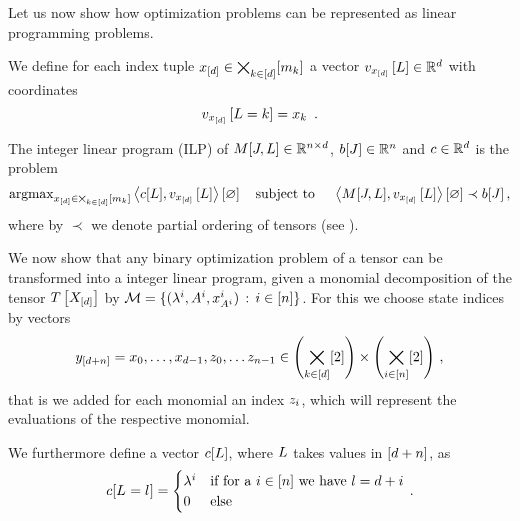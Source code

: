 
Let us now show how optimization problems can be represented as linear programming problems.

We define for each index tuple $x_{[d]}\in\bigtimes_{k\in[d]}[m_{k}]$ a vector $v_{x_{[d]}}\left[L\right]\in\mathbb{R}^{d}$ with coordinates
	\[ \statevectorofat{\shortcatindices}{\selvariable=\catenumerator} = \catindexof{\catenumerator} \, .  \]

\begin{definition}
	The integer linear program (ILP) of $M[J,L]\in\mathbb{R}^{n \times d}$, $b[J]\in\mathbb{R}^{n}$ and $c\in\mathbb{R}^{d}$ is the problem
	\begin{align*}
		\mathrm{argmax}_{x_{[d]}\in\bigtimes_{k\in[d]}[m_{k}]} \left\langle c[L], v_{x_{[d]}}\left[L\right]\right\rangle \left[ \varnothing \right]
		 \quad \text{subject to } \quad \left\langle M[J,L],v_{x_{[d]}}\left[L\right]\right\rangle \left[ \varnothing \right] \prec b[J] \, ,
	\end{align*}
	where by $\prec$ we denote partial ordering of tensors (see ).
\end{definition}


We now show that any binary optimization problem of a tensor can be transformed into a integer linear program, given a monomial decomposition of the tensor $T\left[X_{[d]}\right]$ by $\mathcal{M}=\{(\lambda^{i}, A^{i}, x_{A^{i}}^{i}) \, : \, i\in[n]\}$.
For this we choose state indices by vectors
\begin{align*}
	y_{[d+n]} = x_{0},\ldots,x_{d-1},z_{0},\ldots z_{n-1} \in \left(\bigtimes_{k\in[d]}[2]\right) \times  \left(\bigtimes_{i\in[n]}[2]\right) \, ,
\end{align*}
that is we added for each monomial an index $z_{i}$, which will represent the evaluations of the respective monomial.


We furthermore define a vector $c[L]$, where $L$ takes values in $[d+n]$, as
\begin{align}\label{eq:ilpPotential}
	c[\indexedselvariable] =
	\begin{cases}
		\slicescalarof{\decindex} & \text{if for a } \decindexin \text{ we have } \selindex = \catorder + \decindex \\
		0 & \text{else} 
	\end{cases} \, . 
\end{align}

